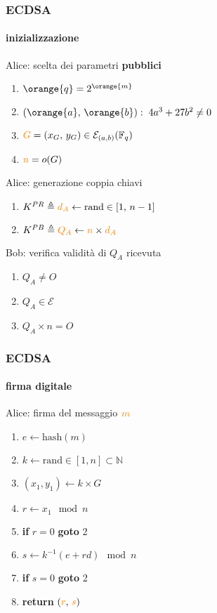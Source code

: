 
\begin{frame}
	\frametitle{ECDSA}
	\framesubtitle{inizializzazione}

{\color{blue}Alice}: scelta dei parametri \textbf{pubblici}
	\begin{enumerate}
	  \item $\orange{q}=2^\orange{m}$
	  \item $(\orange{a},\,\orange{b}):\;4a^3+27b^2\neq 0$
	  \item ${\color{orange}G}=(x_G,\,y_G) \in \mathcal{E}_{(a,b)}(\mathbb{F}_q)$ 
	  \item ${\color{orange}n}=o(G)$
	\end{enumerate}
{\color{blue}Alice}: generazione coppia chiavi
	\begin{enumerate}
	  \item $K^{PR}\triangleq {\color{orange}d_A}\leftarrow \mathrm{rand} \in[1,\,n-1]$
	  \item $K^{PB}\triangleq {\color{orange}Q_A} \leftarrow {\color{orange}n}\times {\color{orange}d_A}$
	\end{enumerate}
{\color{blue}Bob}: verifica validità di $Q_A$ ricevuta
	\begin{enumerate}
	  \item $Q_A\neq O$
	  \item $Q_A\in \mathcal{E}$
	  \item $Q_A\times n=O$
	\end{enumerate}
\end{frame}
\begin{frame}
\frametitle{ECDSA}
\framesubtitle{firma digitale}

	{\color{blue}Alice}: firma del messaggio ${\color{orange}m}$ 
	\begin{enumerate}
	  \item $e \leftarrow \mathrm{hash}(m)$  %
	  \item $k \leftarrow \mathrm{rand} \in [1,n] \subset \mathbb{N}$
	  \item $(x_1,y_1) \leftarrow k \times G$
	  \item $r \leftarrow x_1\mod n$ %
	  \item \textbf{if} $r=0$ \textbf{goto} 2
	  \item $s \leftarrow k^{-1}(e+rd) \mod n$ %
	  \item \textbf{if} $s=0$ \textbf{goto} 2
	  \item \textbf{return} $({\color{orange}r},\,{\color{orange}s})$
	\end{enumerate}
\end{frame}
